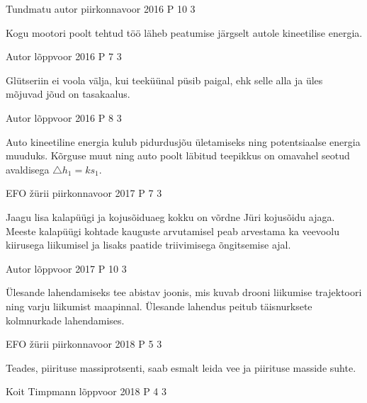 \documentclass[11pt]{article}
\begin{document}
{%
{Tundmatu autor} %
{piirkonnavoor} %
{2016} %
{P 10} %
{3} %
{

\ifHint
Kogu mootori poolt tehtud töö läheb peatumise järgselt autole kineetilise energia.
\fi
}

{Autor} %
{lõppvoor} %
{2016} %
{P 7} %
{3} %
{

\ifHint
Glütseriin ei voola välja, kui teeküünal püsib paigal, ehk selle alla ja üles mõjuvad jõud on tasakaalus.
\fi
}

{Autor} %
{lõppvoor} %
{2016} %
{P 8} %
{3} %
{

\ifHint
Auto kineetiline energia kulub pidurdusjõu ületamiseks ning potentsiaalse energia muuduks. Kõrguse muut ning auto poolt läbitud teepikkus on omavahel seotud avaldisega $\triangle h_1 = ks_1$.
\fi
}

{EFO žürii} %
{piirkonnavoor} %
{2017} %
{P 7} %
{3} %
{

\ifHint
Jaagu lisa kalapüügi ja kojusõiduaeg kokku on võrdne Jüri kojusõidu ajaga. Meeste kalapüügi kohtade kauguste arvutamisel peab arvestama ka veevoolu kiirusega liikumisel ja lisaks paatide triivimisega õngitsemise ajal.
\fi
}

{Autor} %
{lõppvoor} %
{2017} %
{P 10} %
{3} %
{

\ifHint
Ülesande lahendamiseks tee abistav joonis, mis kuvab drooni liikumise trajektoori ning varju liikumist maapinnal. Ülesande lahendus peitub täisnurksete kolmnurkade lahendamises.
\fi
}

{EFO žürii} %
{piirkonnavoor} %
{2018} %
{P 5} %
{3} %
{

\ifHint
Teades, piirituse massiprotsenti, saab esmalt leida vee ja piirituse masside suhte.
\fi
}

{Koit Timpmann} %
{lõppvoor} %
{2018} %
{P 4} %
{3} %
{

}}
\end{document}
